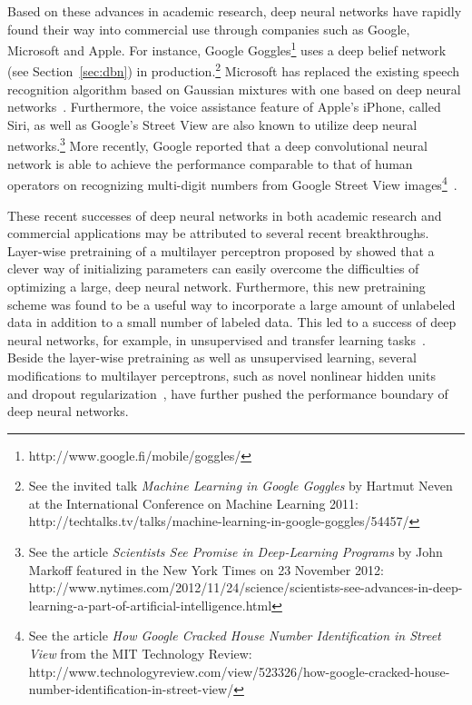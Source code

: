 \documentclass{now}
\begin{document}
Based on these advances in academic research, deep neural networks have
rapidly found their way into commercial use through companies such as
Google, Microsoft and Apple.  For instance, Google Goggles\footnote{
    http://www.google.fi/mobile/goggles/ 
} uses a deep belief network (see Section~\ref{sec:dbn}) in
production.\footnote{
    See the invited talk \textit{Machine Learning in Google Goggles } by
    Hartmut Neven at the International Conference on Machine Learning
    2011:
    http://techtalks.tv/talks/machine-learning-in-google-goggles/54457/
}
Microsoft has replaced the existing speech recognition algorithm based on
Gaussian mixtures with one based on deep neural networks~\citep{Deng2013}.
Furthermore, the voice assistance feature of Apple's iPhone, called Siri,
as well as Google's Street View are also known to utilize deep neural
networks.\footnote{
    See the article \textit{Scientists See Promise in Deep-Learning
    Programs} by John Markoff featured in the New York Times on 23
    November 2012: \\
    http://www.nytimes.com/2012/11/24/science/scientists-see-advances-in-deep-learning-a-part-of-artificial-intelligence.html
} More recently, Google reported that a deep convolutional neural network
is able to achieve the performance comparable to that of human operators
on recognizing multi-digit numbers from Google Street View
images\footnote{
See the article \textit{How Google Cracked House Number Identification in
Street View} from the MIT Technology Review:
\\http://www.technologyreview.com/view/523326/how-google-cracked-house-number-identification-in-street-view/
}~\citep{Goodfellow2013}.

These recent successes of deep neural networks in both academic research
and commercial applications may be attributed to several recent
breakthroughs. Layer-wise pretraining of a multilayer perceptron proposed
by \citet{Hinton2006,Bengio2007nips,Ranzato2007} showed that a clever way
of initializing parameters can easily overcome the difficulties of
optimizing a large, deep neural network.  Furthermore, this new
pretraining scheme was found to be a useful way to incorporate a large
amount of unlabeled data in addition to a small number of labeled data.
This led to a success of deep neural networks, for example, in
unsupervised and transfer learning tasks~\citep[see,
e.g.,][]{Guyon2011,Mesnil2012,Raina2007}. Beside the layer-wise
pretraining as well as unsupervised learning, several modifications to
multilayer perceptrons, such as novel nonlinear hidden units~\citep[see,
e.g.,][]{Nair2010,Glorot2011,Goodfellow2013} and dropout
regularization~\citep{Hinton2012}, have further pushed the performance
boundary of deep neural networks. 
\end{document}
